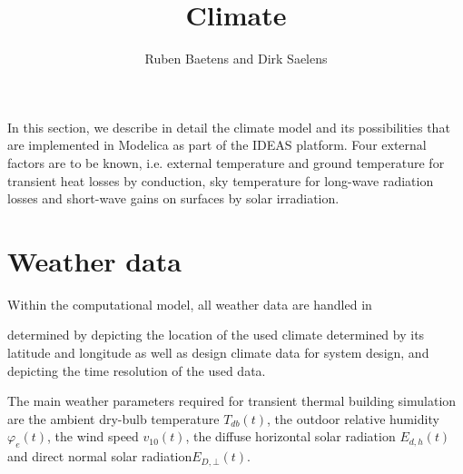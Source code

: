 
\title{Climate}
\author{Ruben Baetens and Dirk Saelens}
\maketitle


\vspace{\baselineskip}

In this section, we describe in detail the climate model and its possibilities that are implemented in Modelica as part of the IDEAS platform. Four external factors are to be known, i.e. external temperature and ground temperature for transient heat losses by conduction, sky temperature for long-wave radiation losses and short-wave gains on surfaces by solar irradiation.

\section{Weather data}
\label{chap:climwea}

Within the computational model, all weather data are handled in 


determined by  depicting the location of the used climate determined by its latitude and longitude as well as design climate data for system design, and  depicting the time resolution of the used data.

The main weather parameters required for transient thermal building simulation are the ambient dry-bulb temperature $T_{db}(t)$, the outdoor relative humidity $\varphi_{e}(t)$, the wind speed $v_{10}(t)$, the diffuse horizontal solar radiation $E_{d,h}(t)$ and direct normal solar radiation$E_{D,\bot}(t)$. 

